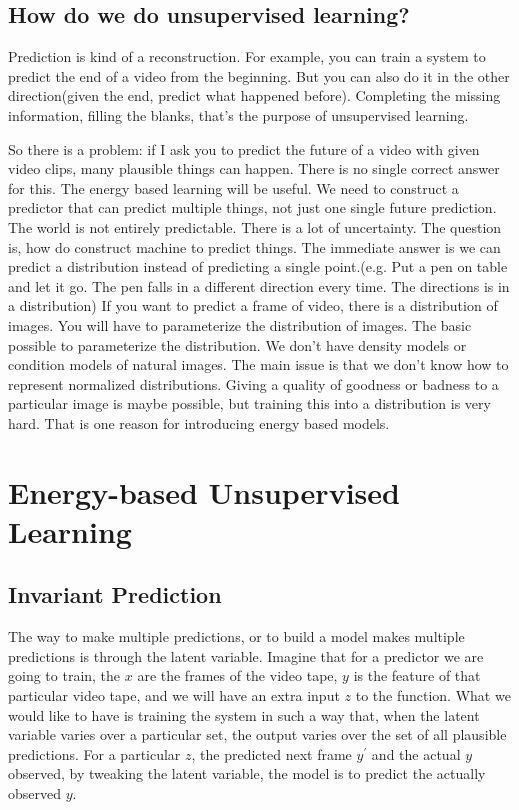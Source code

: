 \subsection{How do we do unsupervised learning?}

Prediction is kind of a reconstruction. For example, you can train a system to predict the end of a video from the beginning. But you can also do it in the other direction(given the end, predict what happened before). Completing the missing information, filling the blanks, that's the purpose of unsupervised learning.

So there is a problem: if I ask you to predict the future of a video with given video clips, many plausible things can happen. There is no single correct answer for this. The energy based learning will be useful. We need to construct a predictor that can predict multiple things, not just one single future prediction. The world is not entirely predictable. There is a lot of uncertainty. The question is, how do construct machine to predict things. The immediate answer is we can predict a distribution instead of predicting a single point.(e.g. Put a pen on table and let it go. The pen falls in a different direction every time. The directions is in a distribution) If you want to predict a frame of video, there is a distribution of images. You will have to parameterize the distribution of images. The basic possible to parameterize the distribution. We don't have density models or condition models of natural images. The main issue is that we don't know how to represent normalized distributions. Giving a quality of goodness or badness to a particular image is maybe possible, but training this into a distribution is very hard. That is one reason for introducing energy based models.

\section{Energy-based Unsupervised Learning}

\subsection{Invariant Prediction}

The way to make multiple predictions, or to build a model makes multiple predictions is through the latent variable. Imagine that for a predictor we are going to train, the $x$ are the frames of the video tape, $y$ is the feature of that particular video tape, and we will have an extra input $z$ to the function. What we would like to have is training the system in such a way that, when the latent variable varies over a particular set, the output varies over the set of all plausible predictions. For a particular $z$, the predicted next frame $y^\prime$ and the actual $y$ observed, by tweaking the latent variable, the model is to predict the actually observed $y$.

